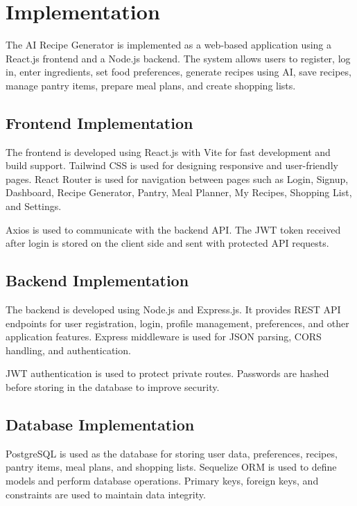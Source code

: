 \section{Implementation}

The AI Recipe Generator is implemented as a web-based application using a React.js frontend and a Node.js backend. The system allows users to register, log in, enter ingredients, set food preferences, generate recipes using AI, save recipes, manage pantry items, prepare meal plans, and create shopping lists.

\subsection{Frontend Implementation}

The frontend is developed using React.js with Vite for fast development and build support. Tailwind CSS is used for designing responsive and user-friendly pages. React Router is used for navigation between pages such as Login, Signup, Dashboard, Recipe Generator, Pantry, Meal Planner, My Recipes, Shopping List, and Settings.

Axios is used to communicate with the backend API. The JWT token received after login is stored on the client side and sent with protected API requests.

\subsection{Backend Implementation}

The backend is developed using Node.js and Express.js. It provides REST API endpoints for user registration, login, profile management, preferences, and other application features. Express middleware is used for JSON parsing, CORS handling, and authentication.

JWT authentication is used to protect private routes. Passwords are hashed before storing in the database to improve security.

\subsection{Database Implementation}

PostgreSQL is used as the database for storing user data, preferences, recipes, pantry items, meal plans, and shopping lists. Sequelize ORM is used to define models and perform database operations. Primary keys, foreign keys, and constraints are used to maintain data integrity.

